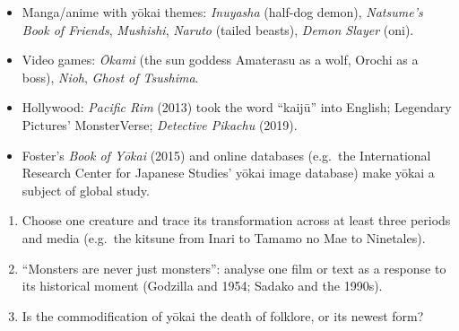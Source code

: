 \begin{itemize}
  \item Manga/anime with yōkai themes: \emph{Inuyasha} (half-dog demon), \emph{Natsume's
        Book of Friends}, \emph{Mushishi}, \emph{Naruto} (tailed beasts), \emph{Demon
        Slayer} (oni).
  \item Video games: \emph{Ōkami} (the sun goddess Amaterasu as a wolf, Orochi as a boss),
        \emph{Nioh}, \emph{Ghost of Tsushima}.
  \item Hollywood: \emph{Pacific Rim} (2013) took the word ``kaijū'' into English; Legendary
        Pictures' MonsterVerse; \emph{Detective Pikachu} (2019).
  \item Foster's \emph{Book of Yōkai} (2015) and online databases (e.g.\ the
        International Research Center for Japanese Studies' yōkai image database) make
        yōkai a subject of global study.
\end{itemize}

\begin{center}
\end{center}

\begin{important}
\begin{enumerate}
  \item Choose one creature and trace its transformation across at least three periods
        and media (e.g.\ the kitsune from Inari to Tamamo no Mae to Ninetales).
  \item ``Monsters are never just monsters'': analyse one film or text as a response to
        its historical moment (Godzilla and 1954; Sadako and the 1990s).
  \item Is the commodification of yōkai the death of folklore, or its newest form?
\end{enumerate}
\end{important}

